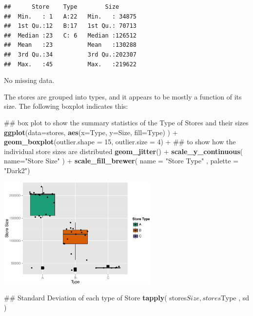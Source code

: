\documentclass[]{article}
\newenvironment{Shaded}{\begin{snugshade}}{\end{snugshade}}
\newcommand{\KeywordTok}[1]{\textcolor[rgb]{0.13,0.29,0.53}{\textbf{{#1}}}}
\newcommand{\DataTypeTok}[1]{\textcolor[rgb]{0.13,0.29,0.53}{{#1}}}
\newcommand{\DecValTok}[1]{\textcolor[rgb]{0.00,0.00,0.81}{{#1}}}
\newcommand{\StringTok}[1]{\textcolor[rgb]{0.31,0.60,0.02}{{#1}}}
\newcommand{\NormalTok}[1]{{#1}}
\begin{document}
\begin{verbatim}
##      Store    Type        Size       
##  Min.   : 1   A:22   Min.   : 34875  
##  1st Qu.:12   B:17   1st Qu.: 70713  
##  Median :23   C: 6   Median :126512  
##  Mean   :23          Mean   :130288  
##  3rd Qu.:34          3rd Qu.:202307  
##  Max.   :45          Max.   :219622
\end{verbatim}

No missing data.

The stores are grouped into types, and it appears to be mostly a
function of its size. The following boxplot indicates this:

\begin{Shaded}
\begin{Highlighting}[]
\NormalTok{## box plot to show the summary statistics of the Type of Stores and their sizes}
\KeywordTok{ggplot}\NormalTok{(}\DataTypeTok{data=}\NormalTok{stores, }
       \KeywordTok{aes}\NormalTok{(}\DataTypeTok{x=}\NormalTok{Type, }\DataTypeTok{y=}\NormalTok{Size, }\DataTypeTok{fill=}\NormalTok{Type) ) +}\StringTok{ }
\StringTok{  }\KeywordTok{geom_boxplot}\NormalTok{(}\DataTypeTok{outlier.shape =} \DecValTok{15}\NormalTok{, }\DataTypeTok{outlier.size =} \DecValTok{4}\NormalTok{) +}
\StringTok{  }\NormalTok{## to show how the individual store sizes are distributed}
\StringTok{  }\KeywordTok{geom_jitter}\NormalTok{() +}
\StringTok{  }\KeywordTok{scale_y_continuous}\NormalTok{( }\DataTypeTok{name=}\StringTok{"Store Size"} \NormalTok{) +}\StringTok{ }
\StringTok{  }\KeywordTok{scale_fill_brewer}\NormalTok{( }\DataTypeTok{name =} \StringTok{"Store Type"} \NormalTok{, }\DataTypeTok{palette =} \StringTok{"Dark2"}\NormalTok{)}
\end{Highlighting}
\end{Shaded}

\includegraphics[width=300px]{PredictingWeeklySalesAtWalmart_files/figure-latex/storeSizeBoxPlot-1}

\begin{Shaded}
\begin{Highlighting}[]
\NormalTok{## Standard Deviation of each type of Store}
\KeywordTok{tapply}\NormalTok{( stores$Size , stores$Type , sd )}
\end{Highlighting}
\end{Shaded}
\end{document}
